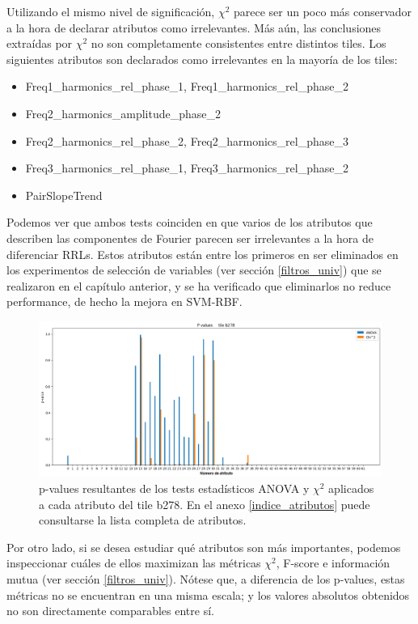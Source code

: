 Utilizando el mismo nivel de significación, $\chi^2$ parece ser un poco más conservador a la hora de declarar atributos como irrelevantes. Más aún, las conclusiones extraídas por $\chi^2$ no son completamente consistentes entre distintos tiles. Los siguientes atributos son declarados como irrelevantes en la mayoría de los tiles:

\begin{itemize}
\item Freq1\_harmonics\_rel\_phase\_1, Freq1\_harmonics\_rel\_phase\_2
\item Freq2\_harmonics\_amplitude\_phase\_2
\item Freq2\_harmonics\_rel\_phase\_2, Freq2\_harmonics\_rel\_phase\_3
\item Freq3\_harmonics\_rel\_phase\_1, Freq3\_harmonics\_rel\_phase\_2
\item PairSlopeTrend
\end{itemize}

Podemos ver que ambos tests coinciden en que varios de los atributos que describen las componentes de Fourier parecen ser irrelevantes a la hora de diferenciar RRLs. Estos atributos están entre los primeros en ser eliminados en los experimentos de selección de variables (ver sección \ref{filtros_univ}) que se realizaron en el capítulo anterior, y se ha verificado que eliminarlos no reduce performance, de hecho la mejora en SVM-RBF. \\

\begin{figure}[h!]
\centering
  \includegraphics[width=1\textwidth]{Kap6/test=b278_variable_importance_pvalues}
\caption{ p-values resultantes de los tests estadísticos ANOVA y $\chi^2$ aplicados a cada atributo del tile b278. En el anexo \protect\ref{indice_atributos} puede consultarse la lista completa de atributos. }
\label{fig:pvalues_b278}
\end{figure}

Por otro lado, si se desea estudiar qué atributos son más importantes, podemos inspeccionar cuáles de ellos maximizan las métricas $\chi^2$, F-score e información mutua (ver sección \ref{filtros_univ}). Nótese que, a diferencia de los p-values, estas métricas no se encuentran en una misma escala; y los valores absolutos obtenidos no son directamente comparables entre sí. \\


